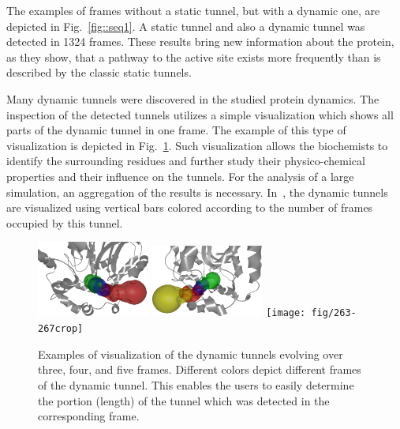 \documentclass[usletter, 10pt, conference]{svjour3}      %
\begin{document}
The examples of frames without a static tunnel, but with a dynamic one, are depicted in Fig.~\ref{fig::seq1}.
A static tunnel and also a dynamic tunnel was detected in 1324 frames.
These results bring new information about the protein, as they show, that a pathway to the active site exists more
frequently than is described by the classic static tunnels.



Many dynamic tunnels were discovered in the studied protein dynamics.
The inspection of the detected tunnels utilizes a simple visualization which shows all parts of the dynamic tunnel in one frame.
The example of this type of visualization is depicted in Fig.~\ref{fig::joint}.
Such visualization allows the biochemists to identify the surrounding residues and further study their physico-chemical properties and their influence on the tunnels.
For the analysis of a large simulation, an aggregation of the results is necessary.
In~\cite{fig::vis1}, the dynamic tunnels are visualized using vertical bars colored according to the number of frames occupied by this tunnel.


   
    
\begin{figure}
\centering
\includegraphics[width=0.33\textwidth]{fig/58-60crop}
\includegraphics[width=0.33\textwidth]{fig/280-283crop}
\texttt{[image: fig/263-267crop]}
\caption{\label{fig::joint}
Examples of visualization of the dynamic tunnels evolving over three, four, and five frames. Different colors depict different frames of the dynamic tunnel. This enables the users to easily determine the portion (length) of the tunnel which was detected in the corresponding frame. 
}
\end{figure}
\end{document}
